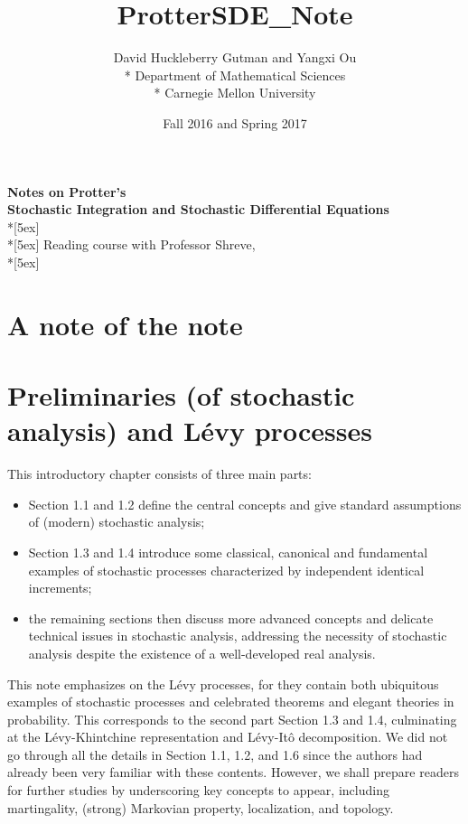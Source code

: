 \documentclass[openany,oneside]{book}
\title{ProtterSDE_Note}
\author{David Huckleberry Gutman and Yangxi Ou \\* Department of Mathematical Sciences \\* Carnegie Mellon University}
\date{Fall 2016 and Spring 2017}
\theoremstyle{definition}
\theoremstyle{remark}
\begin{document}
\frontmatter

\begin{center}	
	\textbf{\Large Notes on Protter's \\ Stochastic Integration and Stochastic Differential Equations} \\*[5ex]
	\theauthor \\*[5ex]
	Reading course with Professor Shreve, \thedate \\*[5ex]
	\tableofcontents
\end{center}


\chapter{A note of the note}



\mainmatter

\chapter{Preliminaries (of stochastic analysis) and L\'evy processes}

This introductory chapter consists of three main parts:
\begin{itemize}
\item Section 1.1 and 1.2 define the central concepts and give standard assumptions of (modern) stochastic analysis;
\item Section 1.3 and 1.4 introduce some classical, canonical and fundamental examples of stochastic processes characterized by independent identical increments;
\item the remaining sections then discuss more advanced concepts and delicate technical issues in stochastic analysis, addressing the necessity of stochastic analysis despite the existence of a well-developed real analysis.
\end{itemize}

This note emphasizes on the L\'evy processes, for they contain both ubiquitous examples of stochastic processes and celebrated theorems and elegant theories in probability. This corresponds to the second part Section 1.3 and 1.4, culminating at the L\'evy-Khintchine representation and L\'evy-It\^o decomposition.  We did not go through all the details in Section 1.1, 1.2, and 1.6 since the authors had already been very familiar with these contents. However, we shall prepare readers for further studies by underscoring key concepts to appear, including martingality, (strong) Markovian property, localization, and topology.
\end{document}
